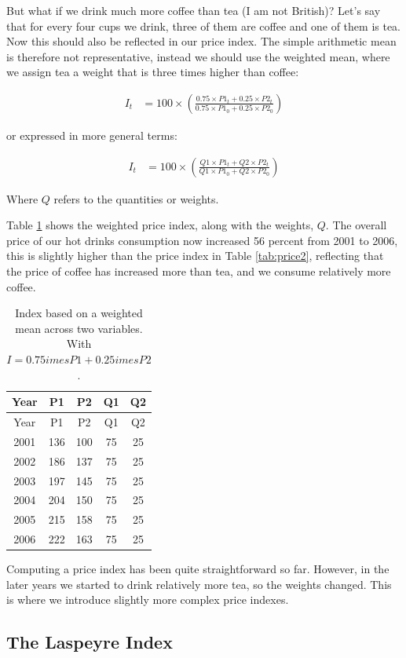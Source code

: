 \documentclass[]{book}
\begin{document}
But what if we drink much more coffee than tea (I am not British)? Let's say that for every four cups we drink, three of them are coffee and one of them is tea. Now this should also be reflected in our price index. The simple arithmetic mean is therefore not representative, instead we should use the weighted mean, where we assign tea a weight that is three times higher than coffee:

\begin{align}
   I_t&=100\times \left(\frac{0.75\times P1_t+0.25\times P2_t}{0.75\times P1_0+0.25\times P2_0}\right)
    \label{eq6}
\end{align}

or expressed in more general terms:

\begin{align}
   I_t&=100\times \left(\frac{Q1 \times P1_t+Q2 \times P2_t}{Q1 \times P1_0+Q2 \times P2_0}\right)
    \label{eq7}
\end{align}

Where \(Q\) refers to the quantities or weights.

Table \ref{tab:price3} shows the weighted price index, along with the weights, \(Q\). The overall price of our hot drinks consumption now increased 56 percent from 2001 to 2006, this is slightly higher than the price index in Table \ref{tab:price2}, reflecting that the price of coffee has increased more than tea, and we consume relatively more coffee.

\begin{longtable}[]{@{}ccccc@{}}
\caption{\label{tab:price3} Index based on a weighted mean across two variables. With \(I=0.75 imes P1+0.25 imes P2\).}\tabularnewline
\toprule
Year & P1 & P2 & Q1 & Q2\tabularnewline
\midrule
\endfirsthead
\toprule
Year & P1 & P2 & Q1 & Q2\tabularnewline
\midrule
\endhead
2001 & 136 & 100 & 75 & 25\tabularnewline
2002 & 186 & 137 & 75 & 25\tabularnewline
2003 & 197 & 145 & 75 & 25\tabularnewline
2004 & 204 & 150 & 75 & 25\tabularnewline
2005 & 215 & 158 & 75 & 25\tabularnewline
2006 & 222 & 163 & 75 & 25\tabularnewline
\bottomrule
\end{longtable}

Computing a price index has been quite straightforward so far. However, in the later years we started to drink relatively more tea, so the weights changed. This is where we introduce slightly more complex price indexes.

\hypertarget{the-laspeyre-index}{%
\subsection{The Laspeyre Index}\label{the-laspeyre-index}}
\end{document}
